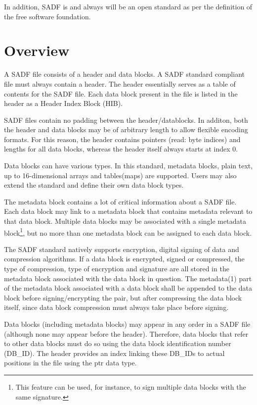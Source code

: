 \documentclass[pagesize=a4]{tufte-book}
\begin{document}
In addition, SADF is and always will be an open standard as per the definition of the free software foundation.

\section{Overview}
A SADF file consists of a header and data blocks. A SADF standard compliant file must always contain a header. The header essentially serves as a table of contents for the SADF file. Each data block present in the file is listed in the header as a Header Index Block (HIB).

SADF files contain no padding between the header/datablocks. In additon, both the header and data blocks may be of arbitrary length to allow flexible encoding formats. For this reason, the header contains pointers (read: byte indices) and lengths for all data blocks, whereas the header itself always starts at index 0.

Data blocks can have various types. In this standard, metadata blocks, plain text, up to 16-dimensional arrays and tables(maps) are supported. Users may also extend the standard and define their own data block types.

The metadata block contains a lot of critical information about a SADF file. Each data block may link to a metadata block that contains metadata relevant to that data block. Multiple data blocks may be associated with a single metadata block\footnote{This feature can be used, for instance, to sign multiple data blocks with the same signature.}, but no more than one metadata block can be assigned to each data block.

The SADF standard natively supports encryption, digital signing of data and compression algorithms. If a data block is encrypted, signed or compressed, the type of compression, type of encryption and signature are all stored in the metadata block associated with the data block in question. The metadata(1) part of the metadata block associated with a data block shall be appended to the data block before signing/encrypting the pair, but after compressing the data block itself, since data block compression must always take place before signing.

Data blocks (including metadata blocks) may appear in any order in a SADF file (although none may appear before the header). Therefore, data blocks that refer to other data blocks must do so using the data block identification number (DB\_ID). The header provides an index linking these DB\_IDs to actual positions 
in the file using the ptr data type.
\end{document}
